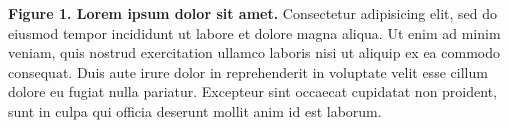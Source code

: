\documentclass[
]{article}
\begin{document}
\newpage

\textbf{Figure 1. Lorem ipsum dolor sit amet.} Consectetur adipisicing
elit, sed do eiusmod tempor incididunt ut labore et dolore magna aliqua.
Ut enim ad minim veniam, quis nostrud exercitation ullamco laboris nisi
ut aliquip ex ea commodo consequat. Duis aute irure dolor in
reprehenderit in voluptate velit esse cillum dolore eu fugiat nulla
pariatur. Excepteur sint occaecat cupidatat non proident, sunt in culpa
qui officia deserunt mollit anim id est laborum.
\end{document}
